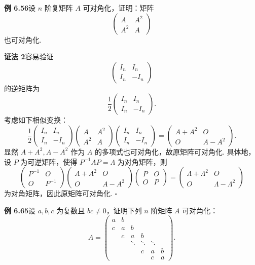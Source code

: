 \documentclass[UTF8, 12pt, fontset=fandol, oneside]{ctexart}
\begin{document}
\noindent\textbf{例 6.56}\quad 设 $n$ 阶复矩阵 $A$ 可对角化，证明：矩阵
\[
\left(\begin{array}{cc}
A & A^2\\
A^2 & A
\end{array}\right)
\]
也可对角化.

\noindent\textbf{证法 2}\quad 容易验证
\[
\left(\begin{array}{cc}
I_n & I_n\\
I_n & -I_n
\end{array}\right)
\]
的逆矩阵为
\[
\frac{1}{2}\left(\begin{array}{cc}
I_n & I_n\\
I_n & -I_n
\end{array}\right).
\]
考虑如下相似变换：
\[
\frac{1}{2}\left(\begin{array}{cc}
I_n & I_n\\
I_n & -I_n
\end{array}\right)
\left(\begin{array}{cc}
A & A^2\\
A^2 & A
\end{array}\right)
\left(\begin{array}{cc}
I_n & I_n\\
I_n & -I_n
\end{array}\right)
=\left(\begin{array}{cc}
A+A^2 & O\\
O & A-A^2
\end{array}\right).
\]
显然 $A+A^2,A-A^2$ 作为 $A$ 的多项式也可对角化，故原矩阵可对角化. 具体地，设 $P$ 为可逆矩阵，使得 $P^{-1}AP=\Lambda$ 为对角矩阵，则
\[
\left(\begin{array}{cc}
P^{-1} & O\\
O & P^{-1}
\end{array}\right)
\left(\begin{array}{cc}
A+A^2 & O\\
O & A-A^2
\end{array}\right)
\left(\begin{array}{cc}
P & O\\
O & P
\end{array}\right)
=\left(\begin{array}{cc}
\Lambda+\Lambda^2 & O\\
O & \Lambda-\Lambda^2
\end{array}\right)
\]
为对角矩阵，因此原矩阵可对角化. $\square$

\noindent\textbf{例 6.65}\quad 设 $a,b,c$ 为复数且 $bc\ne 0$，证明下列 $n$ 阶矩阵 $A$ 可对角化：
\[
A=\left(\begin{array}{cccccc}
a & b & & & &\\
c & a & b & & &\\
& c & a & b & &\\
& & \ddots & \ddots & \ddots &\\
& & & c & a & b\\
& & & & c & a
\end{array}\right).
\]
\end{document}
